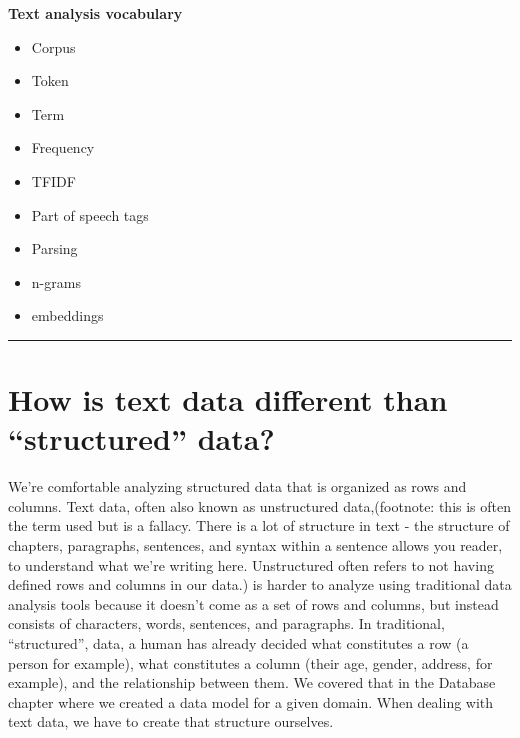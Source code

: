 \documentclass[]{krantz}
\providecommand{\tightlist}{%
  \setlength{\itemsep}{0pt}\setlength{\parskip}{0pt}}
\begin{document}
\textbf{Text analysis vocabulary}

\begin{itemize}
\tightlist
\item
  Corpus
\item
  Token
\item
  Term
\item
  Frequency
\item
  TFIDF
\item
  Part of speech tags
\item
  Parsing
\item
  n-grams
\item
  embeddings
\end{itemize}

\begin{center}\rule{0.5\linewidth}{\linethickness}\end{center}

\section{\texorpdfstring{How is text data different than ``structured''
data?}{How is text data different than structured data?}}\label{how-is-text-data-different-than-structured-data}

We're comfortable analyzing structured data that is organized as rows
and columns. Text data, often also known as unstructured data,(footnote:
this is often the term used but is a fallacy. There is a lot of
structure in text - the structure of chapters, paragraphs, sentences,
and syntax within a sentence allows you reader, to understand what we're
writing here. Unstructured often refers to not having defined rows and
columns in our data.) is harder to analyze using traditional data
analysis tools because it doesn't come as a set of rows and columns, but
instead consists of characters, words, sentences, and paragraphs. In
traditional, ``structured'', data, a human has already decided what
constitutes a row (a person for example), what constitutes a column
(their age, gender, address, for example), and the relationship between
them. We covered that in the Database chapter where we created a data
model for a given domain. When dealing with text data, we have to create
that structure ourselves.
\end{document}
